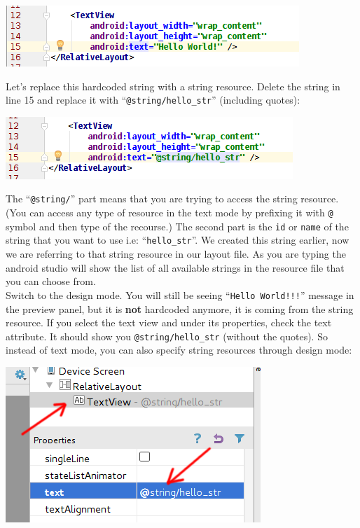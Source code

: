 \begin{center}
	\includegraphics[scale=0.4]{chapters/ch04/images/6_new_string2}
\end{center}

Let's replace this hardcoded string with a string resource. Delete the string in line 15 and replace it with ``\texttt{@string/hello\_str}'' (including quotes):

\begin{center}
	\includegraphics[scale=0.4]{chapters/ch04/images/7_new_string3}
\end{center}

The ``\texttt{@string/}'' part means that you are trying to access the string resource. (You can access any type of resource in the text mode by prefixing it with \texttt{@} symbol and then type of the recourse.) The second part is the \texttt{id} or \texttt{name} of the string that you want to use i.e: ``\texttt{hello\_str}''. We created this string earlier, now we are referring to that string resource in our layout file. As you are typing the android studio will show the list of all available strings in the resource file that you can choose from. \\

Switch to the design mode. You will still be seeing ``\texttt{Hello World!!!}'' message in the preview panel, but it is \textbf{not} hardcoded anymore, it is coming from the string resource. If you select the text view and under its properties, check the text attribute. It should show you \texttt{@string/hello\_str} (without the quotes). So instead of text mode, you can also specify string resources through design mode:

\begin{center}
	\includegraphics[scale=0.4]{chapters/ch04/images/8}
\end{center}

